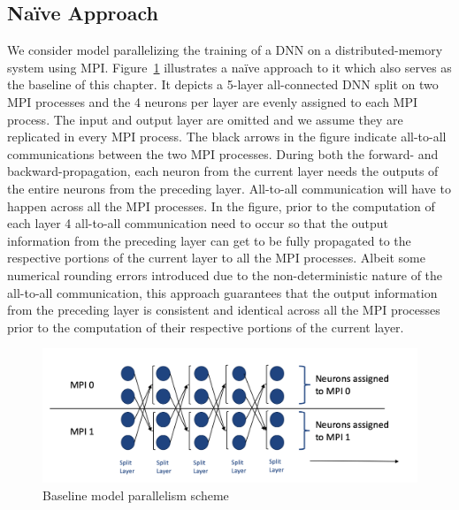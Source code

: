 \subsection{Na\"{i}ve Approach}
We consider model parallelizing the training of a DNN on a distributed-memory 
system using MPI. Figure~\ref{fig:altsplit_baseline} illustrates a na\"{i}ve 
approach to it which also serves as the baseline of this chapter. It depicts a 
5-layer all-connected DNN split on two MPI processes and the 4 neurons per layer 
are evenly assigned to each MPI process. The input and output layer are omitted 
and we assume they are replicated in every MPI process. The black arrows in the 
figure indicate all-to-all communications between the two MPI processes. During 
both the forward- and backward-propagation, each neuron from the current layer 
needs the outputs of the entire neurons from the preceding layer. All-to-all 
communication will have to happen across all the MPI processes. In the figure, 
prior to the computation of each layer 4 all-to-all communication need to occur 
so that the output information from the preceding layer can get to be fully 
propagated to the respective portions of the current layer to all the MPI 
processes.  Albeit some numerical rounding errors introduced due to the 
non-deterministic nature of the all-to-all communication, this approach 
guarantees that the output information from the preceding layer is consistent 
and identical across all the MPI processes prior to the computation of their 
respective portions of the current layer.
\begin{figure}[H]
    \centerline{\includegraphics[scale=0.60]{altsplit/figs/baseline.png}}
    \caption{Baseline model parallelism scheme}
    \label{fig:altsplit_baseline}
\end{figure}

